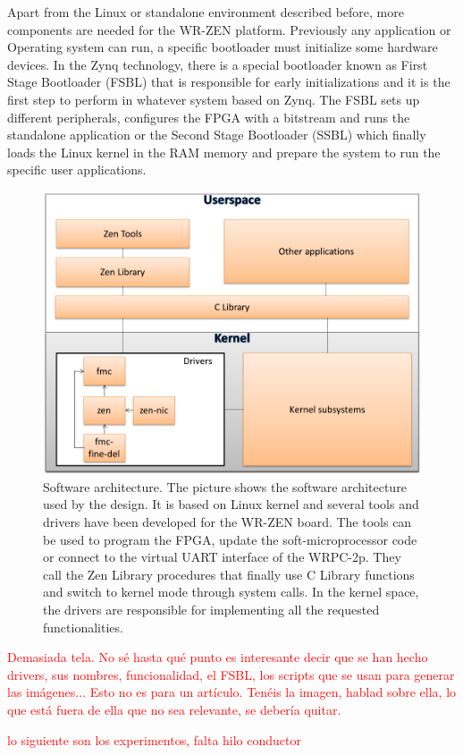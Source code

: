 Apart from the Linux or standalone environment described before, more 
components are needed  for the WR-ZEN platform. Previously any application or 
Operating system can run, a specific bootloader must initialize some hardware 
devices. In the Zynq technology, there is a special bootloader known as First 
Stage Bootloader (FSBL) that is responsible for early initializations and it is 
the first step to perform in whatever system based on Zynq. The FSBL sets up 
different peripherals, configures the FPGA with a bitstream and runs the 
standalone application or the Second Stage Bootloader (SSBL) which finally 
loads the Linux kernel in the RAM memory and prepare the system to run the 
specific user applications.

\begin{figure}[H]
	\centering
	\includegraphics[scale=0.4]{img/software_architecture}
	\caption{Software architecture. The picture shows the software architecture
		used by the design. It is based on Linux kernel and several tools and drivers
		have been developed for the WR-ZEN board. The tools can be used to program 
		the FPGA, update the soft-microprocessor code or connect to the virtual UART
		interface of the WRPC-2p. They call the Zen Library procedures that finally
		use C Library functions and switch to kernel mode through system calls. In the
		kernel space, the drivers are responsible for implementing all the requested 
		functionalities. }
	\label{fig:software_architecture}
\end{figure}

\textcolor{red}{Demasiada tela. No sé hasta qué punto es interesante decir que se han hecho drivers, sus nombres, funcionalidad, el FSBL, los scripts que se usan para generar las imágenes... Esto no es para un artículo. Tenéis la imagen, hablad sobre ella, lo que está fuera de ella que no sea relevante, se debería quitar.}

\textcolor{red}{lo siguiente son los experimentos, falta hilo conductor}

